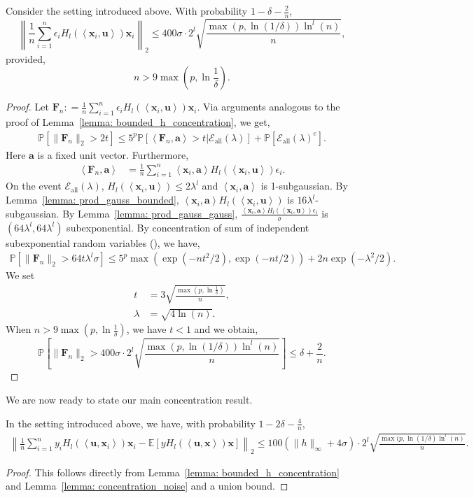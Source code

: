 \documentclass[final,12pt]{colt2018} %
\newcommand{\E}{\mathbb{E}}
\newcommand{\Prob}{\mathbb{P}}
\renewcommand\v[1]{{\ensuremath{\boldsymbol{#1}}}}
\newcommand\ip[1]{\left\langle #1 \right\rangle}
\begin{document}
\begin{lemma} Consider the setting introduced above. With probability $1-\delta - \frac{2}{n}$,
$$\left\| \frac{1}{n} \sum_{i=1}^n \epsilon_i H_l(\ip{\v x_i,\v u}) \v x_i \right\|_2 \leq  400 \sigma \cdot 2^l \sqrt{\frac{\max(p,\ln(1/\delta))\ln^l(n)}{n}}, $$
provided,
$$n> 9 \max\left(p,\ln \frac{1}{\delta} \right).$$
\label{lemma: concentration_noise}
\end{lemma}
\begin{proof}
Let $\v F_n: = \frac{1}{n} \sum_{i=1}^n \epsilon_i H_l( \ip{ \v x_i,\v u}) \v x_i  $. Via arguments analogous to the proof of Lemma~\ref{lemma: bounded_h_concentration}, we get,
\begin{align*}
    \Prob[\|\v F_n \|_2 > 2t] \leq 5^p \Prob[\ip{\v F_n, \v a} > t | \mathcal{E}_\text{all}(\lambda)] + \Prob[\mathcal{E}_\text{all}(\lambda)^c].
\end{align*}
Here $\v a$ is a fixed unit vector. Furthermore,
\begin{align*}
    \ip{\v F_n, \v a} & = \frac{1}{n} \sum_{i=1}^n \ip{\v x_i, \v a} H_l(\ip{\v x_i,\v u}) \epsilon_i.
\end{align*}
On the event $\mathcal{E}_\text{all}(\lambda)$, $H_l(\ip{\v x_i, \v u}) \leq 2\lambda^l$ and $\ip{\v x_i, \v a}$ is 1-subgaussian. By Lemma~\ref{lemma: prod_gauss_bounded}, $\ip{\v x_i, \v a} H_l(\ip{\v x_i, \v u})$ is $16 \lambda ^l$-subgaussian. By Lemma~\ref{lemma: prod_gauss_gauss}, $\frac{\ip{\v x_i, \v a} H_l(\ip{\v x_i, \v u})\epsilon_i}{\sigma}$ is $(64 \lambda^l,64\lambda^l)$ subexponential. By concentration of sum of independent subexponential random variables (), we have,
\begin{align*}
    \Prob[\|\v F_n \|_2 > 64t \lambda^l \sigma ] \leq 5^p \max \left( \exp(-nt^2/2),\exp(-nt/2)\right) + 2n\exp(-\lambda^2/2).
\end{align*}
We set
\begin{align*}
t&= 3 \sqrt{\frac{\max\left(p,\ln \frac{1}{\delta}\right)}{n}},\\
\lambda &= \sqrt{4 \ln(n)}.
\end{align*}
When $n> 9 \max\left(p,\ln \frac{1}{\delta} \right)$, we have $t<1$ and we obtain,
$$\Prob\left[\|\v F_n \|_2 > 400 \sigma \cdot 2^l \sqrt{\frac{\max(p,\ln(1/\delta))\ln^l(n)}{n}}\right] \leq \delta + \frac{2}{n}.$$
\end{proof}
We are now ready to state our main concentration result. 
\begin{theorem} In the setting introduced above, we have, with probability $1-2\delta - \frac{4}{n}$, 
\begin{align*}
    \left\|\frac{1}{n}\sum_{i=1}^n y_i H_l(\ip{\v u, \v x_i}) \v x_i - \E[y H_l(\ip{\v u,\v x}) \v x] \right\|_2 \leq 100(\|h\|_\infty + 4\sigma) \cdot 2^l \sqrt{\frac{\max(p,\ln(1/\delta)\ln^l(n)}{n}}.
\end{align*}
\label{theorem: master_thm_concentration}
\end{theorem}
\begin{proof} This follows directly from Lemma~\ref{lemma: bounded_h_concentration} and Lemma~\ref{lemma: concentration_noise} and a union bound. 
\end{proof}
\end{document}
